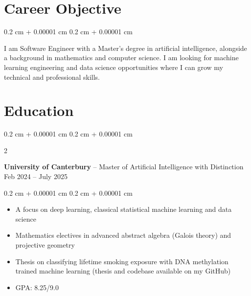 \documentclass[10pt, letterpaper]{article}
\newenvironment{highlights}{
    \begin{itemize}[
        topsep=0.10 cm,
        parsep=0.10 cm,
        partopsep=0pt,
        itemsep=0pt,
        leftmargin=0.4 cm + 10pt
    ]
}{
    \end{itemize}
} %
\newenvironment{highlightsforbulletentries}{
    \begin{itemize}[
        topsep=0.10 cm,
        parsep=0.10 cm,
        partopsep=0pt,
        itemsep=0pt,
        leftmargin=10pt
    ]
}{
    \end{itemize}
} %
\newenvironment{onecolentry}{
    \begin{adjustwidth}{
        0.2 cm + 0.00001 cm
    }{
        0.2 cm + 0.00001 cm
    }
}{
    \end{adjustwidth}
} %
\newenvironment{twocolentry}[2][]{
    \onecolentry
    \def\secondColumn{#2}
    \setcolumnwidth{\fill, 4.5 cm}
    \begin{paracol}{2}
}{
    \switchcolumn \raggedleft \secondColumn
    \end{paracol}
    \endonecolentry
} %
\let\hrefWithoutArrow\href
\renewcommand{\href}[2]{\hrefWithoutArrow{#1}{\ifthenelse{\equal{#2}{}}{ }{#2 }\raisebox{.15ex}{\footnotesize \faExternalLink*}}}
\begin{document}








\section{Career Objective}

\begin{onecolentry}
    I am Software Engineer with a Master's degree in artificial intelligence, alongside a background in mathematics and computer science. I am looking for machine learning engineering and data science opportunities where I can grow my technical and professional skills.
\end{onecolentry}

\section{Education}

\begin{twocolentry}{
        Feb 2024 -- July 2025
    }
    \textbf{University of Canterbury} -- Master of Artificial Intelligence with Distinction \end{twocolentry}

\vspace{0.10 cm}
\begin{onecolentry}
    \begin{highlights}
        \item A focus on deep learning, classical statistical machine learning and data science
        \item Mathematics electives in advanced abstract algebra (Galois theory) and projective geometry
        \item Thesis on classifying lifetime smoking exposure with DNA methylation trained machine learning (thesis and codebase available on my GitHub)
        \item GPA: 8.25/9.0
    \end{highlights}
\end{onecolentry}
\end{document}
